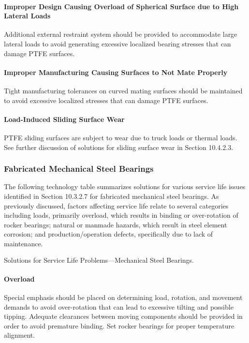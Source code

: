 \paragraph{Improper Design Causing Overload of Spherical Surface due to High Lateral Loads}
Additional external restraint system should be provided to accommodate large lateral loads to avoid generating
excessive localized bearing stresses that can damage PTFE surfaces.

\paragraph{Improper Manufacturing Causing Surfaces to Not Mate Properly}
Tight manufacturing tolerances on curved mating surfaces should be maintained to avoid excessive localized
stresses that can damage PTFE surfaces.

\paragraph{Load-Induced Sliding Surface Wear}
PTFE sliding surfaces are subject to wear due to truck loads or thermal loads. See further discussion of solutions
for sliding surface wear in Section 10.4.2.3.

\subsubsection{Fabricated Mechanical Steel Bearings}
The following technology table summarizes solutions for various service life issues identified in Section 10.3.2.7
for fabricated mechanical steel bearings. As previously discussed, factors affecting service life relate to several
categories including loads, primarily overload, which results in binding or over-rotation of rocker bearings; natural
or manmade hazards, which result in steel element corrosion; and production/operation defects, specifically due to
lack of maintenance.

\begin{table}
  \caption{Solutions for Service Life Problems—Mechanical Steel Bearings.}
  \label{tab:solution-bearing-steel}
\end{table}

\paragraph{Overload}
Special emphasis should be placed on determining load, rotation, and movement demands to avoid over-rotation
that can lead to excessive tilting and possible tipping. Adequate clearances between moving components should be
provided in order to avoid premature binding. Set rocker bearings for proper temperature alignment.

